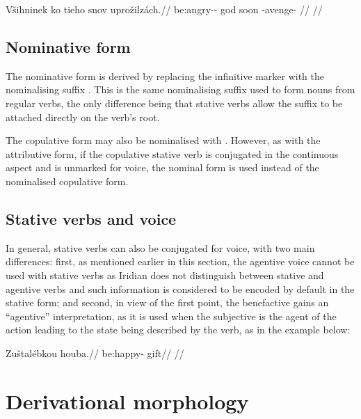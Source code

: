 \ex
\begingl
\gla Všihninek ko tieho snov uprožilzách.//
\glb be:angry-\Pv{}-\Pf{} \Att{} god soon \Refl{}-avenge- //
\glft {}//
\endgl
\xe


\subsection{Nominative form}
The nominative form is derived by replacing the infinitive marker  with the nominalising suffix . This is the same nominalising suffix used to form nouns from regular verbs, the only difference being that stative verbs allow the suffix to be attached directly on the verb's root.

The copulative form may also be nominalised with . However, as with the attributive form, if the copulative stative verb is conjugated in the continuous aspect and is unmarked for voice, the nominal form is used instead of the nominalised copulative form.

\subsection{Stative verbs and voice}

In general, stative verbs can also be conjugated for voice, with two main differences: first, as mentioned earlier in this section, the agentive voice cannot be used with stative verbs as Iridian does not distinguish between stative and agentive verbs and such information is considered to be encoded by default in the stative form; and second, in view of the first point, the benefactive gains an ``agentive'' interpretation, as it is used when the subjective is the agent of the action leading to the state being described by the verb, as in the example below:

\ex
\begingl
\gla Zuštalébkou houba.//
\glb be:happy- gift//
\glft {}//
\endgl
\xe



\section{Derivational morphology}
